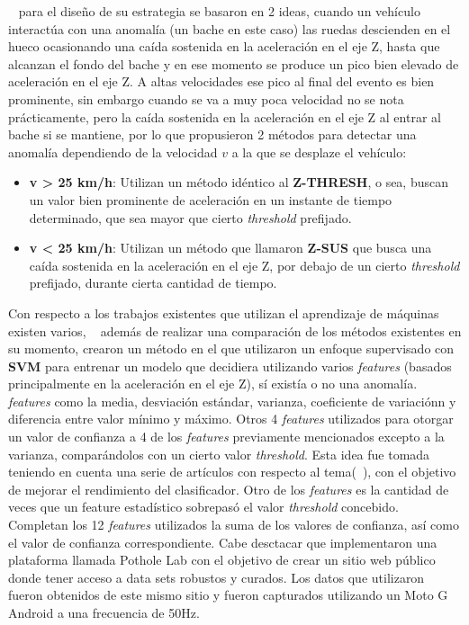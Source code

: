 ~\cite{mohan2008nericell} para el diseño de su estrategia se basaron en 2 ideas, cuando un vehículo interactúa con una
anomalía (un bache en este caso) las ruedas descienden en el hueco ocasionando una caída sostenida en la aceleración en el eje Z,
hasta que alcanzan el fondo del bache y en ese momento se produce un pico bien elevado de aceleración en el eje Z. A altas velocidades
ese pico al final del evento es bien prominente, sin embargo cuando se va a muy poca velocidad no se nota prácticamente, pero la caída
sostenida en la aceleración en el eje Z al entrar al bache si se mantiene, por lo que propusieron 2 métodos para detectar una anomalía
dependiendo de la velocidad $v$ a la que se desplaze el vehículo:\\

\begin{itemize}
	\item \textbf {v > 25 km/h}:  Utilizan un método idéntico al \textbf {Z-THRESH}, o sea, buscan un valor bien prominente de
		aceleración en un instante de tiempo determinado, que sea mayor que cierto \emph{threshold} prefijado.\\
	\item \textbf {v < 25 km/h}:  Utilizan un método que llamaron \textbf {Z-SUS} que busca una caída sostenida en la aceleración
		en el eje Z, por debajo de un cierto \emph{threshold} prefijado, durante cierta cantidad de tiempo.\\
\end{itemize}

Con respecto a los trabajos existentes que utilizan el aprendizaje de máquinas existen varios, ~\cite{carlos2018evaluation} además de realizar
una comparación de los métodos existentes en su momento, crearon un método en el que utilizaron un enfoque supervisado con \textbf{SVM} para entrenar
un modelo que decidiera utilizando varios \emph{features} (basados principalmente en la aceleración en el eje Z), sí existía o no una anomalía. \emph{features}
como la media, desviación estándar, varianza, coeficiente de variaciónn y diferencia entre valor mínimo y máximo. Otros 4 \emph{features} utilizados para
otorgar un valor de confianza a 4 de los \emph{features} previamente mencionados excepto a la varianza, comparándolos con un cierto valor \emph{threshold}.
Esta idea fue tomada teniendo en cuenta una serie de artículos con respecto al tema(~\cite{mednis2011real}), con el objetivo de mejorar el rendimiento
del clasificador. Otro de los \emph{features} es la cantidad de veces que un feature estadístico sobrepasó el valor \emph{threshold} concebido. Completan los
12 \emph{features} utilizados la suma de los valores de confianza, así como el valor de confianza correspondiente. Cabe desctacar que implementaron una
plataforma llamada Pothole Lab con el objetivo de crear un sitio web público donde tener acceso a data sets robustos y curados. Los datos que utilizaron fueron
obtenidos de este mismo sitio y fueron capturados utilizando un Moto G Android a una frecuencia de 50Hz.\\

